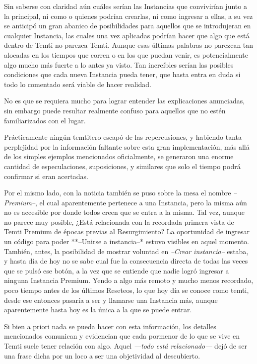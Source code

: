 \documentclass[
  spanish,
]{book}
\begin{document}
Sin saberse con claridad aún cuáles serían las Instancias que convivirían junto a la principal, ni como o quienes podrían crearlas, ni como ingresar a ellas, a su vez se anticipó un gran abanico de posibilidades para aquellos que se introdujeran en cualquier Instancia, las cuales una vez aplicadas podrían hacer que algo que está dentro de Temti no parezca Temti. Aunque esas últimas palabras no parezcan tan alocadas en los tiempos que corren o en los que puedan venir, es potencialmente algo mucho más fuerte a lo antes ya visto. Tan increíbles serían las posibles condiciones que cada nueva Instancia pueda tener, que hasta entra en duda si todo lo comentado será viable de hacer realidad.

No es que se requiera mucho para lograr entender las explicaciones anunciadas, sin embargo puede resultar realmente confuso para aquellos que no estén familiarizados con el lugar.

Prácticamente ningún temtitero escapó de las repercusiones, y habiendo tanta perplejidad por la información faltante sobre esta gran implementación, más allá de los simples ejemplos mencionados oficialmente, se generaron una enorme cantidad de especulaciones, suposiciones, y similares que solo el tiempo podrá confirmar si eran acertadas.

Por el mismo lado, con la noticia también se puso sobre la mesa el nombre \emph{--Premium--}, el cual aparentemente pertenece a una Instancia, pero la misma aún no es accesible por donde todos creen que se entra a la misma. Tal vez, aunque no parece muy posible, ¿Está relacionada con la recordada primera vista de Temti Premium de épocas previas al Resurgimiento?
La oportunidad de ingresar un código para poder **--Unirse a instancia--* estuvo visibles en aquel momento. También, antes, la posibilidad de mostrar voluntad en \emph{--Crear instancia--} estaba, y hasta día de hoy no se sabe cual fue la consecuencia directa de todas las veces que se pulsó ese botón, a la vez que se entiende que nadie logró ingresar a ninguna Instancia Premium.
Yendo a algo más remoto y mucho menos recordado, poco tiempo antes de los últimos Reseteos, lo que hoy día se conoce como temti, desde ese entonces pasaría a ser y llamarse una Instancia más, aunque aparentemente hasta hoy es la única a la que se puede entrar.

Si bien a priori nada se pueda hacer con esta información, los detalles mencionados comunican y evidencian que cada pormenor de lo que se vive en Temti suele tener relación con algo. Aquel \emph{---todo está relacionado---} dejó de ser una frase dicha por un loco a ser una objetividad al descubierto.
\end{document}

